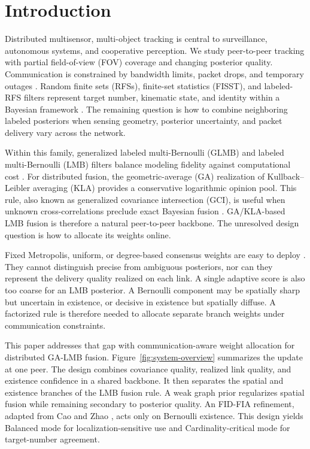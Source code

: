 \section{Introduction}
\label{sec:introduction}

Distributed multisensor, multi-object tracking is central to surveillance, autonomous systems, and cooperative perception. We study peer-to-peer tracking with partial field-of-view (FOV) coverage and changing posterior quality. Communication is constrained by bandwidth limits, packet drops, and temporary outages \cite{Zhang2016CommConstrainedFusion}. Random finite sets (RFSs), finite-set statistics (FISST), and labeled-RFS filters represent target number, kinematic state, and identity within a Bayesian framework \cite{Mahler2003PHD,VoMa2006GMPHD,Mahler2007FISSTBook,Vo2014LRFS,Reuter2014LMB}. The remaining question is how to combine neighboring labeled posteriors when sensing geometry, posterior uncertainty, and packet delivery vary across the network.

Within this family, generalized labeled multi-Bernoulli (GLMB) and labeled multi-Bernoulli (LMB) filters balance modeling fidelity against computational cost \cite{Vo2014LRFS,Reuter2014LMB,Vo2019MSGLMB,Mahler2019ExactBayes,Vo2024OverviewLRFS}. For distributed fusion, the geometric-average (GA) realization of Kullback--Leibler averaging (KLA) provides a conservative logarithmic opinion pool. This rule, also known as generalized covariance intersection (GCI), is useful when unknown cross-correlations preclude exact Bayesian fusion \cite{JulierUhlmann1997CI,Mahler2000RobustFusion,Battistelli2014KLA,Hlinka2014ICI,Uney2013EMDPHD,Bandyopadhyay2018LogOP}. GA/KLA-based LMB fusion is therefore a natural peer-to-peer backbone. The unresolved design question is how to allocate its weights online.

Fixed Metropolis, uniform, or degree-based consensus weights are easy to deploy \cite{XiaoBoydLall2005ConsensusWeights}. They cannot distinguish precise from ambiguous posteriors, nor can they represent the delivery quality realized on each link. A single adaptive score is also too coarse for an LMB posterior. A Bernoulli component may be spatially sharp but uncertain in existence, or decisive in existence but spatially diffuse. A factorized rule is therefore needed to allocate separate branch weights under communication constraints.

This paper addresses that gap with communication-aware weight allocation for distributed GA-LMB fusion. Figure~\ref{fig:system-overview} summarizes the update at one peer. The design combines covariance quality, realized link quality, and existence confidence in a shared backbone. It then separates the spatial and existence branches of the LMB fusion rule. A weak graph prior regularizes spatial fusion while remaining secondary to posterior quality. An FID-FIA refinement, adapted from Cao and Zhao \cite{CaoZhao2025InfoGeometryFusion}, acts only on Bernoulli existence. This design yields Balanced mode for localization-sensitive use and Cardinality-critical mode for target-number agreement.

